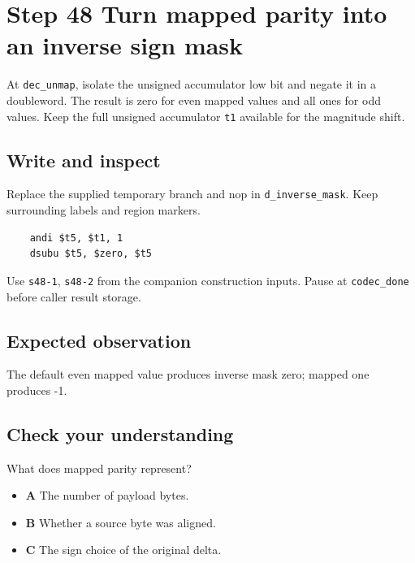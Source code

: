 \section{Step 48 Turn mapped parity into an inverse sign mask}\label{delta-s48}

At \texttt{dec\_unmap}, isolate the unsigned accumulator low bit and negate it in a doubleword. The result is zero for even mapped values and all ones for odd values. Keep the full unsigned accumulator \texttt{t1} available for the magnitude shift.

\subsection{Write and inspect}
Replace the supplied temporary branch and nop in \texttt{d\_inverse\_mask}. Keep surrounding labels and region markers.

\begin{verbatim}
    andi $t5, $t1, 1
    dsubu $t5, $zero, $t5
\end{verbatim}
Use \texttt{s48-1}, \texttt{s48-2} from the companion construction inputs. Pause at \texttt{codec\_done} before caller result storage.

\subsection{Expected observation}
The default even mapped value produces inverse mask zero; mapped one produces -1.

\subsection{Check your understanding}
What does mapped parity represent?

\begin{itemize}
  \item \textbf{A} The number of payload bytes.
  \item \textbf{B} Whether a source byte was aligned.
  \item \textbf{C} The sign choice of the original delta.
\end{itemize}
